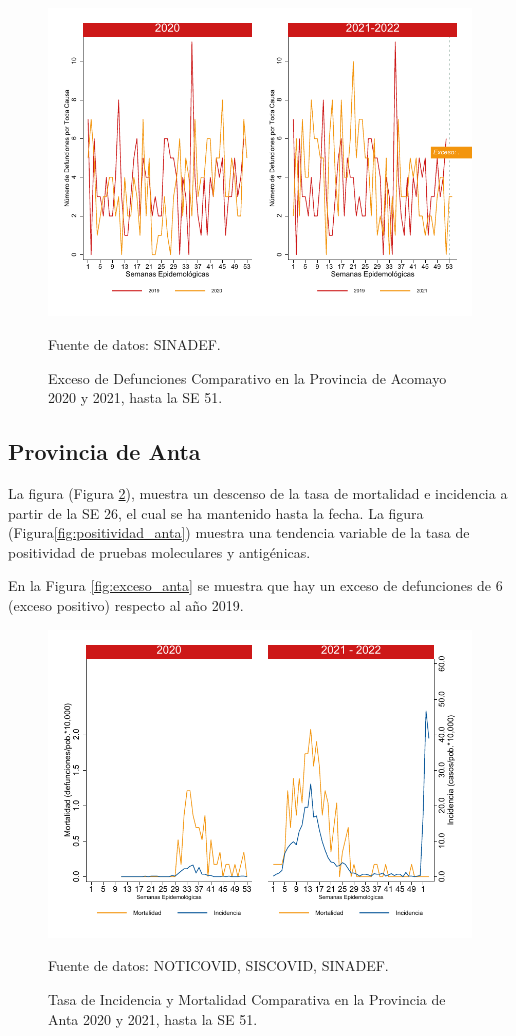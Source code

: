 \documentclass[12pt,a4paper,openany]{book}
\begin{document}
		\begin{figure}[h]
			\caption{Exceso de Defunciones Comparativo en la Provincia de Acomayo 2020 y 2021, hasta la SE 51.}\label{fig:exceso_acomayo}
			\begin{center}
				\includegraphics[width=0.7\linewidth]{../figuras/exceso_1}
			\end{center}
			{\footnotesize {Fuente de datos: SINADEF.}}
		\end{figure}
		
		\clearpage
		
		\subsection*{Provincia de Anta}
		\noindent La figura (Figura \ref{fig:inc_mort_anta}),  muestra un descenso de la tasa de mortalidad e incidencia a partir de la SE 26, el cual se ha mantenido hasta la fecha. 
		\noindent La figura (Figura\ref{fig:positividad_anta}) muestra una tendencia variable de la tasa de positividad de pruebas moleculares y antigénicas.
		
		En la Figura \ref{fig:exceso_anta} se muestra que hay un exceso de defunciones de 6 (exceso positivo) respecto al año 2019.
		
		\begin{figure}[h]
			\caption{Tasa de Incidencia y Mortalidad Comparativa en la Provincia de Anta 2020 y 2021, hasta la SE 51.}\label{fig:inc_mort_anta}
			\begin{center}
				\includegraphics[width=0.7\linewidth]{../figuras/incidencia_mortalidad_20_21_2}
			\end{center}
			{\footnotesize {Fuente de datos: NOTICOVID, SISCOVID, SINADEF.}}
		\end{figure}
		
\end{document}
